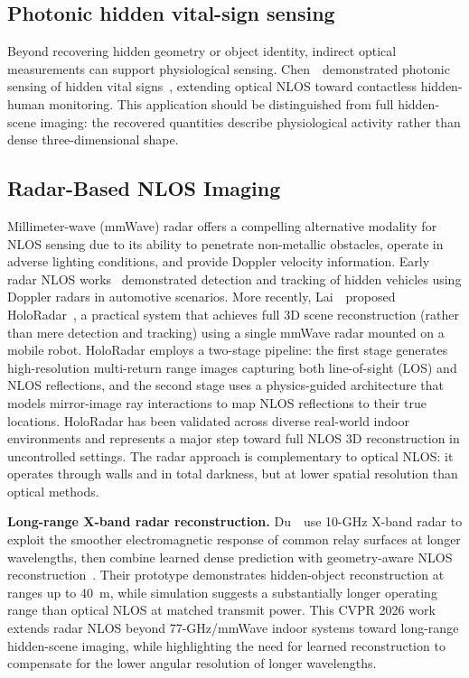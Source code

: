 \subsection{Photonic hidden vital-sign sensing}
Beyond recovering hidden geometry or object identity, indirect optical measurements can support physiological sensing. Chen~\etal~demonstrated photonic sensing of hidden vital signs~\cite{chenPhotonicHiddenVitals2026}, extending optical NLOS toward contactless hidden-human monitoring. This application should be distinguished from full hidden-scene imaging: the recovered quantities describe physiological activity rather than dense three-dimensional shape.

\subsection{Radar-Based NLOS Imaging}
Millimeter-wave (mmWave) radar offers a compelling alternative modality for NLOS sensing due to its ability to penetrate non-metallic obstacles, operate in adverse lighting conditions, and provide Doppler velocity information. Early radar NLOS works~\cite{scheinerseeingstreetcornersa} demonstrated detection and tracking of hidden vehicles using Doppler radars in automotive scenarios. More recently, Lai~\etal~proposed HoloRadar~\cite{laiHoloRadar2025}, a practical system that achieves full 3D scene reconstruction (rather than mere detection and tracking) using a single mmWave radar mounted on a mobile robot. HoloRadar employs a two-stage pipeline: the first stage generates high-resolution multi-return range images capturing both line-of-sight (LOS) and NLOS reflections, and the second stage uses a physics-guided architecture that models mirror-image ray interactions to map NLOS reflections to their true locations. HoloRadar has been validated across diverse real-world indoor environments and represents a major step toward full NLOS 3D reconstruction in uncontrolled settings. The radar approach is complementary to optical NLOS: it operates through walls and in total darkness, but at lower spatial resolution than optical methods.

\vspace{0.8mm}
\noindent \textbf{Long-range X-band radar reconstruction.}
Du~\etal~use 10-GHz X-band radar to exploit the smoother electromagnetic response of common relay surfaces at longer wavelengths, then combine learned dense prediction with geometry-aware NLOS reconstruction~\cite{duXBandRadarNLOS2026}. Their prototype demonstrates hidden-object reconstruction at ranges up to 40~m, while simulation suggests a substantially longer operating range than optical NLOS at matched transmit power. This CVPR 2026 work extends radar NLOS beyond 77-GHz/mmWave indoor systems toward long-range hidden-scene imaging, while highlighting the need for learned reconstruction to compensate for the lower angular resolution of longer wavelengths.

